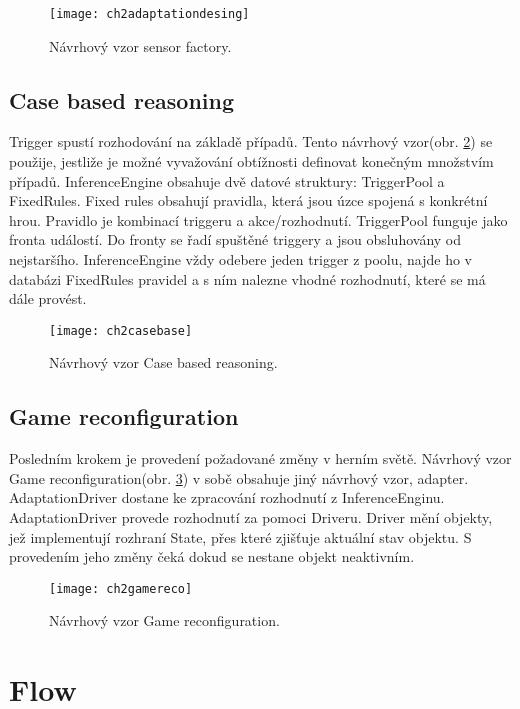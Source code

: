 \begin{figure}
  \centering
  \texttt{[image: ch2adaptationdesing]}
	\caption{Návrhový vzor sensor factory. \cite{SwPatterns} }
	\label{fig:ch2adaptationdesing}
\end{figure}

\subsection{Case based reasoning}

Trigger spustí rozhodování na základě případů. Tento návrhový vzor(obr. \ref{fig:ch2casebase}) se použije, jestliže je možné vyvažování obtížnosti definovat konečným množstvím případů. InferenceEngine obsahuje dvě datové struktury: TriggerPool a FixedRules. Fixed rules obsahují pravidla, která jsou úzce spojená s konkrétní hrou. Pravidlo je kombinací triggeru a akce/rozhodnutí. TriggerPool funguje jako fronta událostí. Do fronty se řadí spuštěné triggery a jsou obsluhovány od nejstaršího. InferenceEngine vždy odebere jeden trigger z poolu, najde ho v databázi FixedRules pravidel a s ním nalezne vhodné rozhodnutí, které se má dále provést.

\begin{figure}
  \centering
  \texttt{[image: ch2casebase]}
	\caption{Návrhový vzor Case based reasoning. \cite{SwPatterns} }
	\label{fig:ch2casebase}
\end{figure}

\subsection{Game reconfiguration}

Posledním krokem je provedení požadované změny v herním světě. Návrhový vzor Game reconfiguration(obr. \ref{fig:ch2gamereco}) v sobě obsahuje jiný návrhový vzor, adapter. AdaptationDriver dostane ke zpracování rozhodnutí z InferenceEnginu. AdaptationDriver provede rozhodnutí za pomoci Driveru. Driver mění objekty, jež implementují rozhraní State, přes které zjišťuje aktuální stav objektu. S provedením jeho změny čeká dokud se nestane objekt neaktivním.

\begin{figure}
  \centering
  \texttt{[image: ch2gamereco]}
	\caption{Návrhový vzor Game reconfiguration. \cite{SwPatterns} }
	\label{fig:ch2gamereco}
\end{figure}

\section{Flow}

